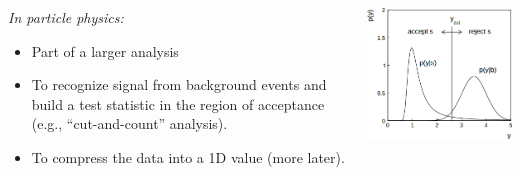 \documentclass{beamer}
\begin{document}
\begin{frame}
    \begin{columns}
        \begin{column}{0.7\textwidth}
            {\it In particle physics:}
            \begin{itemize}
                \item Part of a larger analysis
                \item To recognize signal from background events
                      and build a test statistic in the region of acceptance (e.g., ``cut-and-count'' analysis).
                \item To compress the data into a 1D value (more later).
            \end{itemize}
        \end{column}
        \begin{column}{0.3\textwidth}
            \begin{center}
                \includegraphics[width=\textwidth]{figures/cut.png}
            \end{center}
        \end{column}
    \end{columns}

\end{frame}
\end{document}
